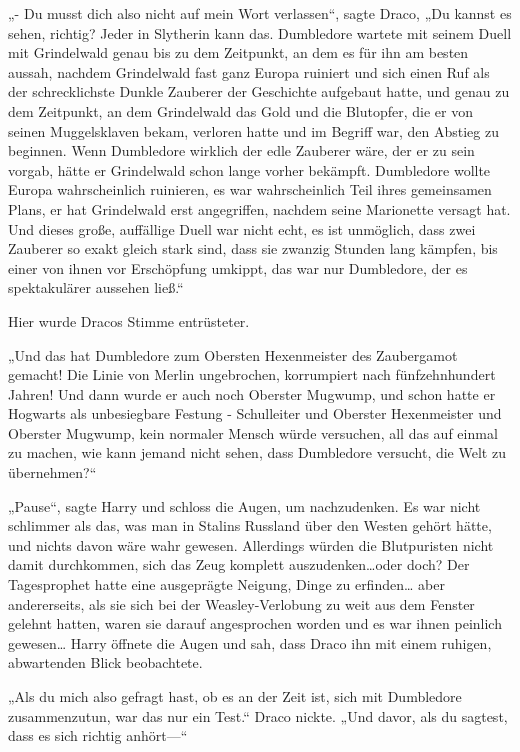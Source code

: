{„- Du musst dich also nicht auf mein Wort verlassen“, sagte Draco, „Du kannst es sehen, richtig? Jeder in Slytherin kann das. Dumbledore wartete mit seinem Duell mit Grindelwald genau bis zu dem Zeitpunkt, an dem es für ihn am besten aussah, nachdem Grindelwald fast ganz Europa ruiniert und sich einen Ruf als der schrecklichste Dunkle Zauberer der Geschichte aufgebaut hatte, und genau zu dem Zeitpunkt, an dem Grindelwald das Gold und die Blutopfer, die er von seinen Muggelsklaven bekam, verloren hatte und im Begriff war, den Abstieg zu beginnen. Wenn Dumbledore wirklich der edle Zauberer wäre, der er zu sein vorgab, hätte er Grindelwald schon lange vorher bekämpft. Dumbledore wollte Europa wahrscheinlich ruinieren, es war wahrscheinlich Teil ihres gemeinsamen Plans, er hat Grindelwald erst angegriffen, nachdem seine Marionette versagt hat. Und dieses große, auffällige Duell war nicht echt, es ist unmöglich, dass zwei Zauberer so exakt gleich stark sind, dass sie zwanzig Stunden lang kämpfen, bis einer von ihnen vor Erschöpfung umkippt, das war nur Dumbledore, der es spektakulärer aussehen ließ.“

Hier wurde Dracos Stimme entrüsteter.

„Und das hat Dumbledore zum Obersten Hexenmeister des Zaubergamot gemacht! Die Linie von Merlin ungebrochen, korrumpiert nach fünfzehnhundert Jahren! Und dann wurde er auch noch Oberster Mugwump, und schon hatte er Hogwarts als unbesiegbare Festung - Schulleiter und Oberster Hexenmeister und Oberster Mugwump, kein normaler Mensch würde versuchen, all das auf einmal zu machen, wie kann jemand nicht sehen, dass Dumbledore versucht, die Welt zu übernehmen?“

„Pause“, sagte Harry und schloss die Augen, um nachzudenken. Es war nicht schlimmer als das, was man in Stalins Russland über den Westen gehört hätte, und nichts davon wäre wahr gewesen. Allerdings würden die Blutpuristen nicht damit durchkommen, sich das Zeug komplett auszudenken…oder doch? Der Tagesprophet hatte eine ausgeprägte Neigung, Dinge zu erfinden… aber andererseits, als sie sich bei der Weasley-Verlobung zu weit aus dem Fenster gelehnt hatten, waren sie darauf angesprochen worden und es war ihnen peinlich gewesen… Harry öffnete die Augen und sah, dass Draco ihn mit einem ruhigen, abwartenden Blick beobachtete.

„Als du mich also gefragt hast, ob es an der Zeit ist, sich mit Dumbledore zusammenzutun, war das nur ein Test.“ Draco nickte. „Und davor, als du sagtest, dass es sich richtig anhört—“

}

